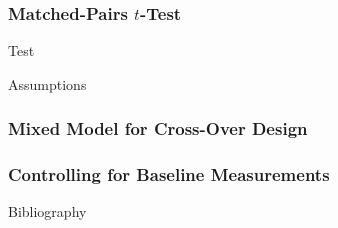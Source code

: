 \documentclass{beamer}
\begin{document}
\subsubsection{Matched-Pairs $t$-Test}
\begin{frame}{Test}
    
\end{frame}

\begin{frame}{Assumptions}
    
\end{frame}
\subsubsection{Mixed Model for Cross-Over Design}

\subsubsection{Controlling for Baseline Measurements}

\begin{frame}{Bibliography}
    
    
\end{frame}
\end{document}
